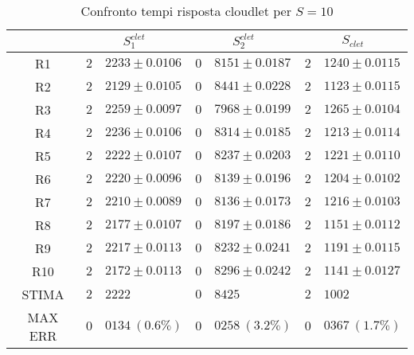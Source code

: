 \begin{table}[!h]
\begin{tabular}{c|r@{.}l|r@{.}l|r@{.}l}
& \multicolumn{2}{|c|}{$S_1^{clet}$}
& \multicolumn{2}{|c|}{$S_2^{clet}$}
& \multicolumn{2}{|c}{$S_{clet}$} 
\\          
\hline
R1      & $2$&$2233 \pm 0.0106$ & $0$&$8151 \pm 0.0187$ & $2$&$1240 \pm 0.0115$ \\
R2      & $2$&$2129 \pm 0.0105$ & $0$&$8441 \pm 0.0228$ & $2$&$1123 \pm 0.0115$ \\
R3      & $2$&$2259 \pm 0.0097$ & $0$&$7968 \pm 0.0199$ & $2$&$1265 \pm 0.0104$ \\
R4      & $2$&$2236 \pm 0.0106$ & $0$&$8314 \pm 0.0185$ & $2$&$1213 \pm 0.0114$ \\
R5      & $2$&$2222 \pm 0.0107$ & $0$&$8237 \pm 0.0203$ & $2$&$1221 \pm 0.0110$ \\
R6      & $2$&$2220 \pm 0.0096$ & $0$&$8139 \pm 0.0196$ & $2$&$1204 \pm 0.0102$ \\
R7      & $2$&$2210 \pm 0.0089$ & $0$&$8136 \pm 0.0173$ & $2$&$1216 \pm 0.0103$ \\
R8      & $2$&$2177 \pm 0.0107$ & $0$&$8197 \pm 0.0186$ & $2$&$1151 \pm 0.0112$ \\
R9      & $2$&$2217 \pm 0.0113$ & $0$&$8232 \pm 0.0241$ & $2$&$1191 \pm 0.0115$ \\
R10     & $2$&$2172 \pm 0.0113$ & $0$&$8296 \pm 0.0242$ & $2$&$1141 \pm 0.0127$ \\
STIMA   & $2$&$2222$            & $0$&$8425$            & $2$&$1002$            \\
MAX ERR & $0$&$0134 \ (0.6\%)$  & $0$&$0258 \ (3.2\%)$  & $0$&$0367 \ (1.7\%)$    
\end{tabular}
\centering
\caption{Confronto tempi risposta cloudlet per $S=10$}
\label{tab:10_sclet}
\end{table}
